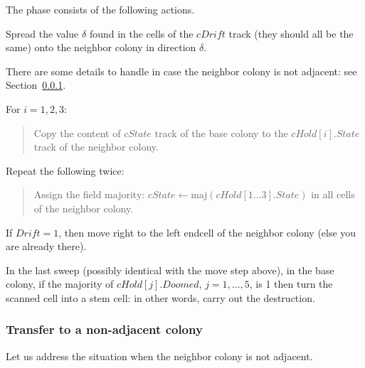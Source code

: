 \documentclass[12pt]{memoir}
\newcommand{\fld}[1]{\ensuremath{\textit{#1}}}
\newcommand{\maj}{\mathrm{maj}}
\newcommand{\Drift}{\fld{Drift}}
\newcommand{\Doomed}{\fld{Doomed}}
\newcommand{\cDrift}{\fld{cDrift}}
\newcommand{\cHold}{\fld{cHold}}
\newcommand{\State}{\fld{State}}
\newcommand{\cState}{\fld{cState}}
\begin{document}
The phase consists of the following actions.
\begin{enumerate}[1.]
\item
  Spread the value \( \delta \) found in the cells of the \( \cDrift \) track
  (they should all be the same)
  onto the neighbor colony in direction \( \delta \).

There are some details to handle in case the neighbor colony is not adjacent:
see Section~\ref{sec:adjacency}.

\item\label{i:transfer-state} For \( i=1,2,3 \):
        \begin{quote}
          Copy the content of \( \cState \) track of the base colony
            to the \( \cHold[i].\State \) track of the neighbor colony.
        \end{quote}

\item Repeat the following twice:
  \begin{quote}
 Assign the field majority: \( \cState\gets \maj(\cHold[1 \dots  3].\State) \)
in all cells of the neighbor colony.    
  \end{quote}
  
\item If \( \Drift = 1 \), then move right to the left endcell of the neighbor colony
(else you are already there).

        \begin{sloppypar}
          \item In the last sweep (possibly identical with the move step above), 
            in the base colony, if the majority of \( \cHold[j].\Doomed \), \( j=1,\dots,5 \), 
            is 1 then turn the scanned cell into a stem cell: 
            in other words, carry out the destruction.
          \end{sloppypar}


\end{enumerate}

\subsubsection{Transfer to a non-adjacent colony}\label{sec:adjacency}

Let us address the situation when the neighbor colony is not adjacent.
\end{document}
